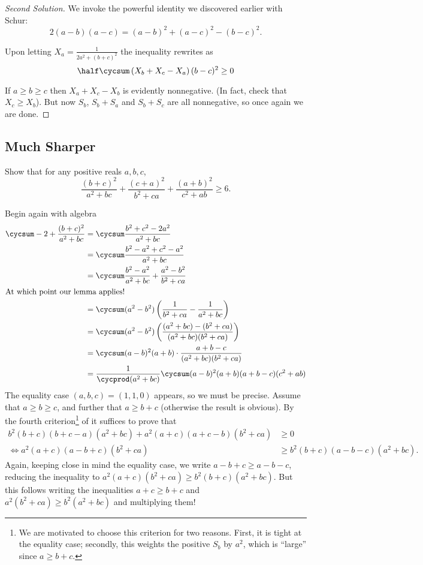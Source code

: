 \documentclass{scrartcl}
\begin{document}
\begin{proof}[Second Solution]
  We invoke the powerful identity we discovered earlier with Schur:
  \[ 2(a-b)(a-c) = (a-b)^2 + (a-c)^2 - (b-c)^2. \]

  Upon letting $X_a = \frac{1}{2a^2+(b+c)^2}$ the inequality rewrites as
  \[ \half \cycsum \left( X_b+X_c-X_a \right)(b-c)^2 \ge 0 \]

  If $a \ge b \ge c$ then $X_a + X_c - X_b$ is evidently nonnegative.
  (In fact, check that $X_c \ge X_b$).
  But now $S_b$, $S_b+S_a$ and $S_b+S_c$ are all nonnegative, so once again we are done.
\end{proof}

\subsection{Much Sharper}
\begin{example}
  Show that for any positive reals $a,b,c$,
  \[ \frac{(b+c)^2}{a^2+bc} + \frac{(c+a)^2}{b^2+ca} + \frac{(a+b)^2}{c^2+ab} \ge 6. \]
\end{example}
\begin{soln}
  Begin again with algebra
  \begin{align*}
    \cycsum -2 + \frac{(b+c)^2}{a^2+bc} &= \cycsum \frac{b^2+c^2-2a^2}{a^2+bc} \\
    &= \cycsum \frac{b^2-a^2 + c^2-a^2}{a^2+bc} \\
    &= \cycsum \frac{b^2-a^2}{a^2+bc} + \frac{a^2-b^2}{b^2+ca} \\
    \intertext{At which point our lemma applies!}
    &= \cycsum (a^2-b^2) \left( \frac{1}{b^2+ca} - \frac{1}{a^2+bc} \right) \\
    &= \cycsum (a^2-b^2) \left( \frac{(a^2+bc)-(b^2+ca)}{(a^2+bc)(b^2+ca)} \right) \\
    &= \cycsum (a-b)^2(a+b) \cdot \frac{a+b-c}{(a^2+bc)(b^2+ca)}  \\
    &= \frac{1}{\cycprod (a^2+bc)} \cycsum (a-b)^2(a+b)(a+b-c)(c^2+ab)
  \end{align*}
  The equality case $(a,b,c) = (1,1,0)$ appears, so we must be precise.
  Assume that $a \ge b \ge c$, and further that $a \ge b+c$ (otherwise the result is obvious).
  By the fourth criterion\footnote{We are motivated to choose this criterion for two reasons.
    First, it is tight at the equality case; secondly,
    this weights the positive $S_b$ by $a^2$, which is ``large'' since $a \ge b+c$.}
  of  it suffices to prove that
  \begin{align*}
    b^2(b+c)(b+c-a)(a^2+bc) + a^2(a+c)(a+c-b)(b^2+ca) &\ge 0 \\
    \iff a^2(a+c)(a-b+c)(b^2+ca) &\ge b^2(b+c)(a-b-c)(a^2+bc).
  \end{align*}
  Again, keeping close in mind the equality case, we write $a-b+c \ge a-b-c$,
  reducing the inequality to $a^2(a+c)(b^2+ca) \ge b^2(b+c)(a^2+bc)$.
  But this follows writing the inequalities $a+c \ge b+c$
  and $a^2(b^2+ca) \ge b^2(a^2+bc)$ and multiplying them!
\end{soln}
\end{document}
